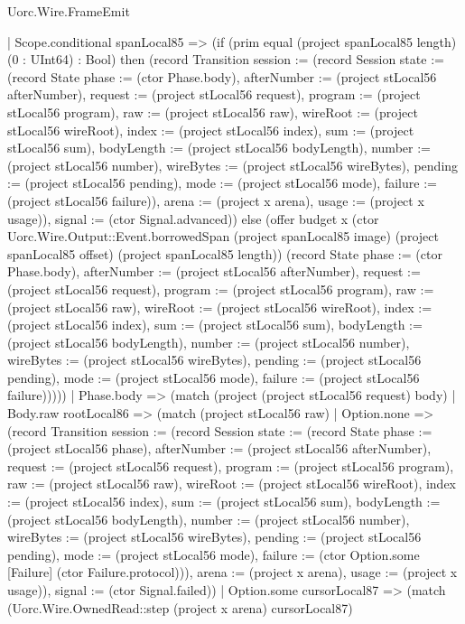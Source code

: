 \begin{lexlean}{Uorc.Wire.FrameEmit}
\begin{semanticmodule}
{          | Scope.conditional spanLocal85 => (if (prim equal (project spanLocal85 length) (0 : UInt64) : Bool) then (record Transition {session := (record Session {state := (record State {phase := (ctor Phase.body), afterNumber := (project stLocal56 afterNumber), request := (project stLocal56 request), program := (project stLocal56 program), raw := (project stLocal56 raw), wireRoot := (project stLocal56 wireRoot), index := (project stLocal56 index), sum := (project stLocal56 sum), bodyLength := (project stLocal56 bodyLength), number := (project stLocal56 number), wireBytes := (project stLocal56 wireBytes), pending := (project stLocal56 pending), mode := (project stLocal56 mode), failure := (project stLocal56 failure)}), arena := (project x arena), usage := (project x usage)}), signal := (ctor Signal.advanced)}) else (offer budget x (ctor Uorc.Wire.Output::Event.borrowedSpan (project spanLocal85 image) (project spanLocal85 offset) (project spanLocal85 length)) (record State {phase := (ctor Phase.body), afterNumber := (project stLocal56 afterNumber), request := (project stLocal56 request), program := (project stLocal56 program), raw := (project stLocal56 raw), wireRoot := (project stLocal56 wireRoot), index := (project stLocal56 index), sum := (project stLocal56 sum), bodyLength := (project stLocal56 bodyLength), number := (project stLocal56 number), wireBytes := (project stLocal56 wireBytes), pending := (project stLocal56 pending), mode := (project stLocal56 mode), failure := (project stLocal56 failure)}))))
        | Phase.body => (match (project (project stLocal56 request) body)
          | Body.raw rootLocal86 => (match (project stLocal56 raw)
            | Option.none => (record Transition {session := (record Session {state := (record State {phase := (project stLocal56 phase), afterNumber := (project stLocal56 afterNumber), request := (project stLocal56 request), program := (project stLocal56 program), raw := (project stLocal56 raw), wireRoot := (project stLocal56 wireRoot), index := (project stLocal56 index), sum := (project stLocal56 sum), bodyLength := (project stLocal56 bodyLength), number := (project stLocal56 number), wireBytes := (project stLocal56 wireBytes), pending := (project stLocal56 pending), mode := (project stLocal56 mode), failure := (ctor Option.some [Failure] (ctor Failure.protocol))}), arena := (project x arena), usage := (project x usage)}), signal := (ctor Signal.failed)})
            | Option.some cursorLocal87 => (match (Uorc.Wire.OwnedRead::step (project x arena) cursorLocal87)
}
\end{semanticmodule}
\end{lexlean}
